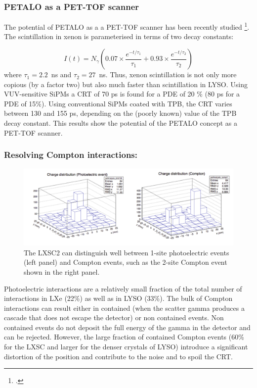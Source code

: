 \subsubsection*{PETALO as a PET-TOF scanner}
The potential of PETALO as a a PET-TOF scanner has been recently studied \footcite{PetaloTOF}. The scintillation in xenon is parameterised in terms of two decay constants:

\begin{equation}
I(t) = N_\gamma (0.07 \times \frac{e^{-t/\tau_1}}{\tau_1} + 0.93 \times \frac{e^{-t/\tau_2}}{\tau_2})
\label{eq.scint}
\end{equation}
where $\tau_1 = 2.2$~ns and $\tau_2 = 27$~ns. Thus, xenon scintillation is not only more copious (by a factor two) but also much faster than scintillation in LYSO. Using VUV-sensitive SiPMs a CRT of 70 ps is found for a PDE of 20 \% (80 ps for a PDE of 15\%). Using conventional SiPMs coated with TPB, the CRT varies between 130 and 155 ps, depending on the (poorly known) value of the TPB decay constant. This results show the
potential of the PETALO concept as a PET-TOF scanner.  

\subsubsection*{Resolving Compton interactions:}

\begin{figure}[!htbp]
	\centering
	\includegraphics[scale=0.6]{img/Compton.png}
	\caption{The LXSC2 can distinguish well between 1-site photoelectric events (left panel) and
	Compton events, such as the 2-site Compton event shown in the right panel.}\label{fig.Compton} 
\end{figure}

Photoelectric interactions are a relatively small fraction of the total number of interactions in LXe (22\%) as well as in LYSO (33\%). The bulk of Compton interactions can result either in contained (when the scatter gamma produces a cascade that does not escape the detector) or non contained events. Non contained events do not deposit the full energy of the gamma in the detector and can be rejected. However, the large fraction of contained Compton events (60\% for the LXSC and larger for the denser crystals of LYSO) introduce a significant distortion of the position and contribute to the noise and to spoil the CRT. 

